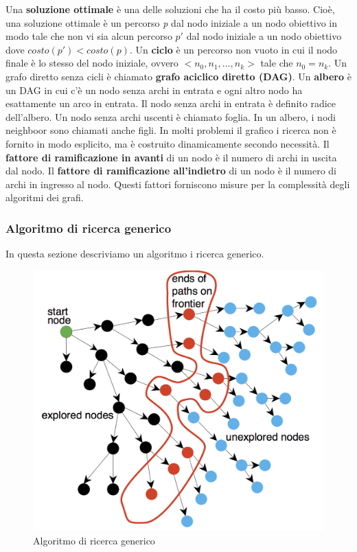 \documentclass[a4paper]{extarticle}
\begin{document}
Una \textbf{soluzione ottimale} è una delle soluzioni che ha il costo più basso. Cioè, una soluzione ottimale è un percorso \textit{p} dal nodo iniziale a un nodo obiettivo in modo tale che non vi sia alcun percorso $p'$ dal nodo iniziale a un nodo obiettivo dove $costo(p')<costo(p)$. Un \textbf{ciclo} è un percorso non vuoto in cui il nodo finale è lo stesso del nodo iniziale, ovvero $<n_0,n_1,\dots,n_k>$ tale che $n_0=n_k$. Un grafo diretto senza cicli è chiamato \textbf{grafo aciclico diretto (DAG)}. Un \textbf{albero} è un DAG in cui c'è un nodo senza archi in entrata e ogni altro nodo ha esattamente un arco in entrata. Il nodo senza archi in entrata è definito radice dell'albero. Un nodo senza archi uscenti è chiamato foglia. In un albero, i nodi neighboor sono chiamati anche figli. In molti problemi il grafico i ricerca non è fornito in modo esplicito, ma è costruito dinamicamente secondo necessità. Il \textbf{fattore di ramificazione in avanti} di un nodo è il numero di archi in uscita dal nodo. Il \textbf{fattore di ramificazione all'indietro} di un nodo è il numero di archi in ingresso al nodo. Questi fattori forniscono misure per la complessità degli algoritmi dei grafi. 


\subsubsection{Algoritmo di ricerca generico}

In questa sezione descriviamo un algoritmo i ricerca generico.
\begin{figure}[h!]
\begin{center}
\includegraphics[scale=0.4]{algoritmoDiRicerca.png}
\caption{Algoritmo di ricerca generico}
\end{center}
\end{figure}
\end{document}
